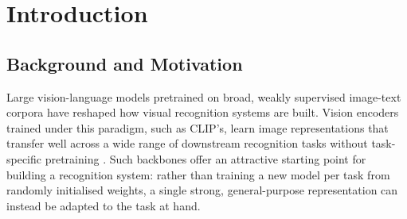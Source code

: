 %
%

\chapter{Introduction}
\label{ch:introduction}

\section{Background and Motivation}
\label{sec:ch1-motivation}

Large vision-language models pretrained on broad, weakly supervised
image-text corpora have reshaped how visual recognition systems are built.
Vision encoders trained under this paradigm, such as CLIP's, learn image
representations that transfer well across a wide range of downstream
recognition tasks without task-specific pretraining
\parencite{radford2021learning}. Such backbones offer an attractive starting
point for building a recognition system: rather than training a new model
per task from randomly initialised weights, a single strong,
general-purpose representation can instead be adapted to the task at hand.

